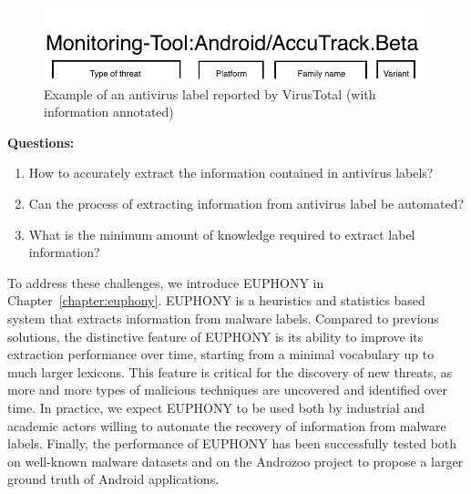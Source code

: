\begin{figure}[!ht]
        \centering
	\includegraphics[width=0.75\linewidth]{figures/introduction/label.pdf}
        \caption[Example of an antivirus label reported by VirusTotal]{Example of an antivirus label reported by VirusTotal (with information annotated)}
	\label{figure:introduction:label}
\end{figure}

\begin{mdframed}[hidealllines=true,nobreak=true]
\textbf{Questions:}

\begin{enumerate}
	\item How to accurately extract the information contained in antivirus labels?
	\item Can the process of extracting information from antivirus label be automated?
	\item What is the minimum amount of knowledge required to extract label information?
\end{enumerate}
\end{mdframed}

To address these challenges, we introduce EUPHONY in Chapter~\ref{chapter:euphony}.
EUPHONY is a heuristics and statistics based system that extracts information from malware labels.
Compared to previous solutions, the distinctive feature of EUPHONY is its ability to improve its extraction performance over time, starting from a minimal vocabulary up to much larger lexicons.
This feature is critical for the discovery of new threats, as more and more types of malicious techniques are uncovered and identified over time.
In practice, we expect EUPHONY to be used both by industrial and academic actors willing to automate the recovery of information from malware labels.
Finally, the performance of EUPHONY has been successfully tested both on well-known malware datasets and on the Androzoo project to propose a larger ground truth of Android applications.

